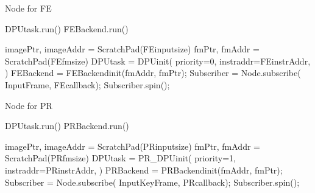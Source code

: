 

\begin{algorithm}[h]
    \caption{ Node for FE }
    \begin{algorithmic}[1]
        \State DPUtask.run()
        \State FEBackend.run()
        \EndFunction

        \State imagePtr, imageAddr = ScratchPad(FEinputsize)
        \State fmPtr, fmAddr = ScratchPad(FEfmsize)
        \State DPUtask = DPUinit({\color{red}  priority=0},{\color{blue} instraddr=FEinstrAddr, }
        \State \qquad \qquad \qquad {} ) 
        \State FEBackend = FEBackendinit({\color{blue}fmAddr, fmPtr});
        \State Subscriber = Node.subscribe( InputFrame, FEcallback);
        \State Subscriber.spin();
        \EndFunction
    \end{algorithmic}
\end{algorithm}

\begin{algorithm}[h]
    \caption{ Node for PR }
    \begin{algorithmic}[1]
        \State DPUtask.run()
        \State PRBackend.run()
        \EndFunction

        \State imagePtr, imageAddr = ScratchPad(PRinputsize)
        \State fmPtr, fmAddr = ScratchPad(PRfmsize)
        \State DPUtask = PR\_DPUinit( {\color{red} priority=1},{\color{blue} instraddr=PRinstrAddr}, 
        \State \qquad \qquad \qquad {} ) 
        \State PRBackend = PRBackendinit({\color{blue}fmAddr, fmPtr});
        \State Subscriber = Node.subscribe( InputKeyFrame, PRcallback);
        \State Subscriber.spin();
        \EndFunction
    \end{algorithmic}
\end{algorithm}



